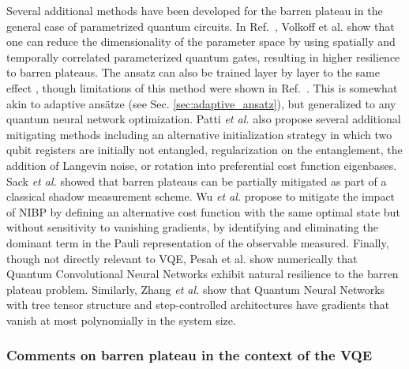 Several additional methods have been developed for the barren plateau in the general case of parametrized quantum circuits. In Ref.~\cite{Volkoff2021}, Volkoff et al. show that one can reduce the dimensionality of the parameter space by using spatially and temporally correlated parameterized quantum gates, resulting in higher resilience to barren plateaus. The ansatz can also be trained layer by layer to the same effect \cite{Skolik2021}, though limitations of this method were shown in Ref.~\cite{Campos2021}. This is somewhat akin to adaptive ans{\"{a}}tze (see Sec. \ref{sec:adaptive_ansatz}), but generalized to any quantum neural network optimization. Patti \textit{et al.} \cite{Patti2021} also propose several additional mitigating methods including an alternative initialization strategy in which two qubit registers are initially not entangled, regularization on the entanglement, the addition of Langevin noise, or rotation into preferential cost function eigenbases. Sack \textit{et al.} \cite{Sack2022} showed that barren plateaus can be partially mitigated as part of a classical shadow measurement scheme. Wu \textit{et al.} \cite{Wu2021_mit} propose to mitigate the impact of NIBP by defining an alternative cost function with the same optimal state but without sensitivity to vanishing gradients, by identifying and eliminating the dominant term in the Pauli representation of the observable measured.
Finally, though not directly relevant to VQE, Pesah et al. \cite{Pesah2020} show numerically that Quantum Convolutional Neural Networks exhibit natural resilience to the barren plateau problem. Similarly, Zhang \textit{et al.} \cite{Zhang2020} show that Quantum Neural Networks with tree tensor structure and step-controlled architectures have gradients that vanish at most polynomially in the system size. 

\subsubsection{Comments on barren plateau in the context of the VQE} \label{sec:bp_for_vqe}

